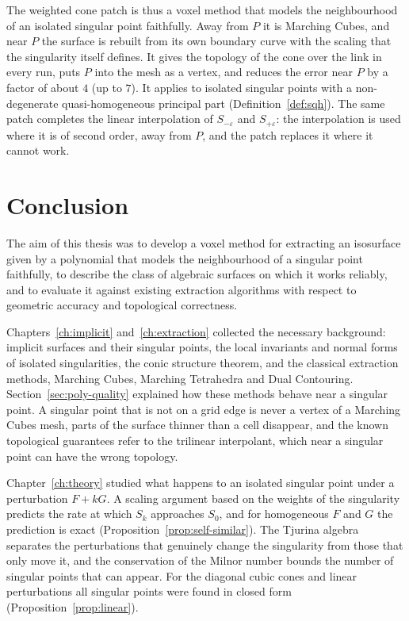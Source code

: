 \documentclass[12pt, a4paper, oneside]{book}
\theoremstyle{plain}
\theoremstyle{definition}
\theoremstyle{remark}
\theoremstyle{definition}
\begin{document}
The weighted cone patch is thus a voxel method that models the neighbourhood of an isolated singular point faithfully. Away from $P$ it is Marching Cubes, and near $P$ the surface is rebuilt from its own boundary curve with the scaling that the singularity itself defines. It gives the topology of the cone over the link in every run, puts $P$ into the mesh as a vertex, and reduces the error near $P$ by a factor of about $4$ (up to $7$). It applies to isolated singular points with a non-degenerate quasi-homogeneous principal part (Definition~\ref{def:sqh}). The same patch completes the linear interpolation of $S_{-\varepsilon}$ and $S_{+\varepsilon}$: the interpolation is used where it is of second order, away from $P$, and the patch replaces it where it cannot work.

\chapter*{Conclusion}
\label{ch:conclusion}

The aim of this thesis was to develop a voxel method for extracting an isosurface given by a polynomial that models the neighbourhood of a singular point faithfully, to describe the class of algebraic surfaces on which it works reliably, and to evaluate it against existing extraction algorithms with respect to geometric accuracy and topological correctness.

Chapters~\ref{ch:implicit} and~\ref{ch:extraction} collected the necessary background: implicit surfaces and their singular points, the local invariants and normal forms of isolated singularities, the conic structure theorem, and the classical extraction methods, Marching Cubes, Marching Tetrahedra and Dual Contouring. Section~\ref{sec:poly-quality} explained how these methods behave near a singular point. A singular point that is not on a grid edge is never a vertex of a Marching Cubes mesh, parts of the surface thinner than a cell disappear, and the known topological guarantees refer to the trilinear interpolant, which near a singular point can have the wrong topology.

Chapter~\ref{ch:theory} studied what happens to an isolated singular point under a perturbation $F+kG$. A scaling argument based on the weights of the singularity predicts the rate at which $S_k$ approaches $S_0$, and for homogeneous $F$ and $G$ the prediction is exact (Proposition~\ref{prop:self-similar}). The Tjurina algebra separates the perturbations that genuinely change the singularity from those that only move it, and the conservation of the Milnor number bounds the number of singular points that can appear. For the diagonal cubic cones and linear perturbations all singular points were found in closed form (Proposition~\ref{prop:linear}).
\end{document}
